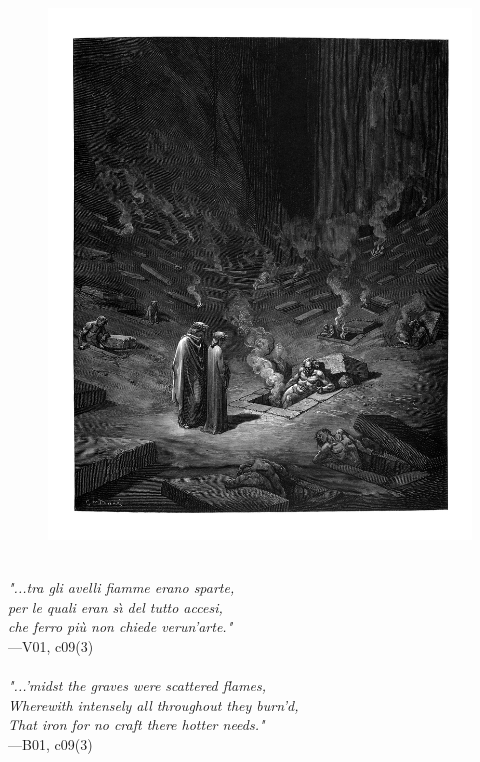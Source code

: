 \documentclass[../Dore_vision.tex]{subfiles}
\begin{document}
\begin{figure}[ht]
\centering
\includegraphics[height=\figsize]{illustrations/book_1/V01, c09(3).jpg}
\end{figure}

\begin{center}
\begin{minipage}{0.8\linewidth}
\textit{\\
"...tra gli avelli fiamme erano sparte,\\per le quali eran s\`{\i} del tutto accesi,\\che ferro più non chiede verun’arte."} \\
—V01, c09(3) \\~\\
\textit{"...'midst the graves were scattered flames,\\Wherewith intensely all throughout they burn'd,\\That iron for no craft there hotter needs."} \\
—B01, c09(3)
\end{minipage}
\end{center}
\end{document}

